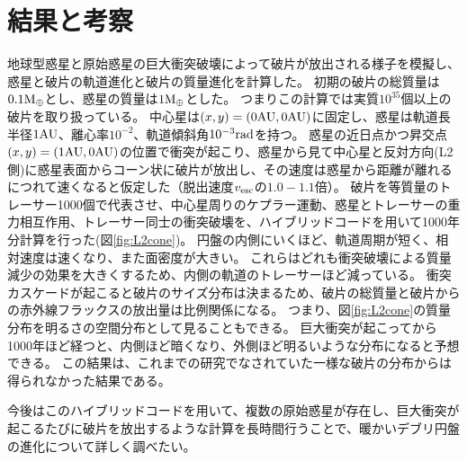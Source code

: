 \documentclass[a4paper,10pt,oneside,twocolumn,notitlepage,final]{jarticle}
\begin{document}

\section{結果と考察}
地球型惑星と原始惑星の巨大衝突破壊によって破片が放出される様子を模擬し、惑星と破片の軌道進化と破片の質量進化を計算した。
初期の破片の総質量は$0.1 {\rm M_{\oplus}}$とし、惑星の質量は$1 {\rm M_{\oplus}}$とした。
つまりこの計算では実質$10^{35}$個以上の破片を取り扱っている。
中心星は$(x,y) = (0 {\rm AU},0 {\rm AU})$に固定し、惑星は軌道長半径$1 {\rm AU}$、離心率$10^{-2}$、軌道傾斜角$10^{-3} {\rm rad}$を持つ。
惑星の近日点かつ昇交点$(x,y) = (1 {\rm AU},0 {\rm AU})$の位置で衝突が起こり、惑星から見て中心星と反対方向(L2側)に惑星表面からコーン状に破片が放出し、その速度は惑星から距離が離れるにつれて速くなると仮定した（脱出速度$v_{\rm esc}$の$1.0-1.1$倍）。
破片を等質量のトレーサー1000個で代表させ、中心星周りのケプラー運動、惑星とトレーサーの重力相互作用、トレーサー同士の衝突破壊を、ハイブリッドコードを用いて1000年分計算を行った(図\ref{fig:L2cone})。
円盤の内側にいくほど、軌道周期が短く、相対速度は速くなり、また面密度が大きい。
これらはどれも衝突破壊による質量減少の効果を大きくするため、内側の軌道のトレーサーほど減っている。
衝突カスケードが起こると破片のサイズ分布は決まるため、破片の総質量と破片からの赤外線フラックスの放出量は比例関係になる。
つまり、図\ref{fig:L2cone}の質量分布を明るさの空間分布として見ることもできる。
巨大衝突が起こってから1000年ほど経つと、内側ほど暗くなり、外側ほど明るいような分布になると予想できる。
この結果は、これまでの研究でなされていた一様な破片の分布からは得られなかった結果である。

今後はこのハイブリッドコードを用いて、複数の原始惑星が存在し、巨大衝突が起こるたびに破片を放出するような計算を長時間行うことで、暖かいデブリ円盤の進化について詳しく調べたい。
\end{document}
